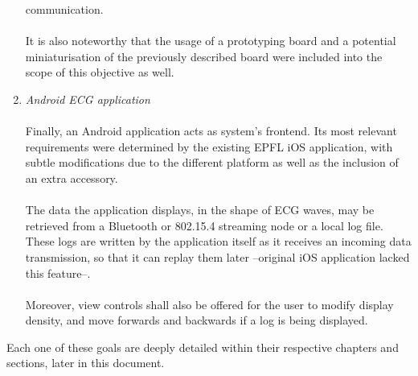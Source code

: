 \begin{enumerate}
				communication.\\\\
				It is also noteworthy that the usage of a prototyping board and a potential miniaturisation of
				the previously described board were included into the scope of this objective as well.\\
			\item \emph{Android ECG application}\\\\
				Finally, an Android application acts as system's frontend. Its most relevant requirements were
				determined by the existing EPFL iOS application, with subtle modifications due to the different
				platform as well as the inclusion of an extra accessory.\\\\
				The data the application displays, in the shape of ECG waves, may be retrieved from a Bluetooth
				or 802.15.4 streaming node or a local log file. These logs are written by the application itself
				as it receives an incoming data transmission, so that it can replay them later --original
				iOS application lacked this feature--.\\\\
				Moreover, view controls shall also be offered for the user to modify display density, and move
				forwards and backwards if a log is being displayed.\\
		\end{enumerate}
		Each one of these goals are deeply detailed within their respective chapters and sections, later in this
		document.
		
